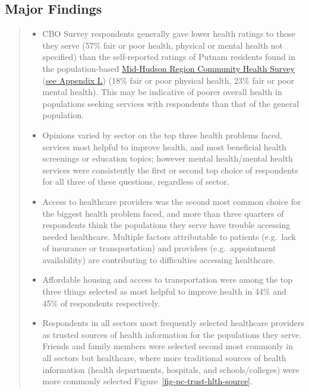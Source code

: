 \documentclass[
  english,
  letterpaper,
]{report}
\begin{document}
\subsection{Major Findings}\label{major-findings-2}

\begin{quote}
\begin{itemize}
\item
  CBO Survey respondents generally gave lower health ratings to those
  they serve (57\% fair or poor health, physical or mental health not
  specified) than the self-reported ratings of Putnam residents found in
  the population-based
  \href{https://www.putnamcountyny.gov/images/Departments/Department_of_Health/PDF_Documents/MHRCHS-Putnam_2025_Approved.pdf}{Mid-Hudson
  Region Community Health Survey}
  (\hyperref[sec-appendix-l-mid-hudson-regional-community-health-survey]{see
  Appendix L}) (18\% fair or poor physical health, 23\% fair or poor
  mental health). This may be indicative of poorer overall health in
  populations seeking services with respondents than that of the general
  population.
\item
  Opinions varied by sector on the top three health problems faced,
  services most helpful to improve health, and most beneficial health
  screenings or education topics; however mental health/mental health
  services were consistently the first or second top choice of
  respondents for all three of these questions, regardless of sector.
\item
  Access to healthcare providers was the second most common choice for
  the biggest health problem faced, and more than three quarters of
  respondents think the populations they serve have trouble accessing
  needed healthcare. Multiple factors attributable to patients
  (e.g.~lack of insurance or transportation) and providers
  (e.g.~appointment availability) are contributing to difficulties
  accessing healthcare.
\item
  Affordable housing and access to transportation were among the top
  three things selected as most helpful to improve health in 44\% and
  45\% of respondents respectively.
\item
  Respondents in all sectors most frequently selected healthcare
  providers as trusted sources of health information for the populations
  they serve. Friends and family members were selected second most
  commonly in all sectors but healthcare, where more traditional sources
  of health information (health departments, hospitals, and
  schools/colleges) were more commonly selected
  Figure~\ref{fig-pc-trust-hlth-source}.
\end{itemize}
\end{quote}
\end{document}
